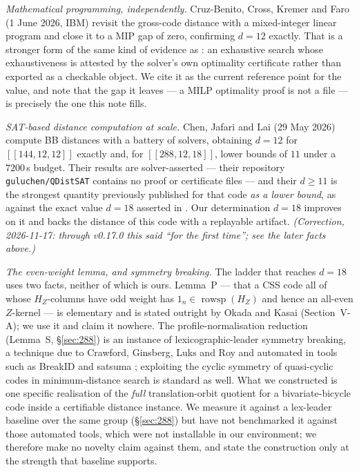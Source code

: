 \documentclass[11pt]{amsart}
\newcommand{\rowsp}{\operatorname{rowsp}}
\newcommand{\HZ}{H_{Z}}
\newcommand{\gross}{[[144,12,12]]}
\theoremstyle{plain}
\theoremstyle{definition}
\theoremstyle{remark}
\begin{document}
\emph{Mathematical programming, independently.} Cruz-Benito, Cross, Kremer and
Faro \cite{CruzBenito} (1 June 2026, IBM) revisit the gross-code distance with
a mixed-integer linear program and close it to a MIP gap of zero, confirming
$d=12$ exactly. That is a stronger form of the same kind of evidence as
\cite{BCGMRY}: an exhaustive search whose exhaustiveness is attested by the
solver's own optimality certificate rather than exported as a checkable
object. We cite it as the current reference point for the value, and note that
the gap it leaves --- a MILP optimality proof is not a file --- is precisely
the one this note fills.

\emph{SAT-based distance computation at scale.} Chen, Jafari and Lai
\cite{ChenJafariLai} (29 May 2026) compute BB distances with a battery of
solvers, obtaining $d=12$ for $\gross$ exactly and, for $[[288,12,18]]$, lower
bounds of $11$ under a $7200$\,s budget. Their results are solver-asserted ---
their repository \texttt{guluchen/QDistSAT} contains no proof or certificate
files --- and their $d\ge11$ is the strongest quantity previously published for
that code \emph{as a lower bound}, as against the exact value $d=18$ asserted
in \cite{BCGMRY}. Our determination $d=18$ improves on it and backs the
distance of this code with a replayable artifact. \emph{(Correction,
2026-11-17: through v0.17.0 this said ``for the first time''; see the later
facts above.)}

\emph{The even-weight lemma, and symmetry breaking.} The ladder that reaches
$d=18$ uses two facts, neither of which is ours. Lemma~P --- that a CSS code
all of whose $\HZ$-columns have odd weight has $1_n\in\rowsp(\HZ)$ and hence an
all-even $Z$-kernel --- is elementary and is stated outright by Okada and Kasai
\cite{OkadaKasai} (Section~V-A); we use it and claim it nowhere. The
profile-normalisation reduction (Lemma~S, \S\ref{sec:288}) is an instance of
lexicographic-leader symmetry breaking, a technique due to Crawford, Ginsberg,
Luks and Roy \cite{CGLR} and automated in tools such as BreakID \cite{BreakID}
and satsuma \cite{satsuma}; exploiting the cyclic symmetry of quasi-cyclic
codes in minimum-distance search is standard as well. What we constructed is
one specific realisation of the \emph{full} translation-orbit quotient for a
bivariate-bicycle code inside a certifiable distance instance. We measure it
against a lex-leader baseline over the same group (\S\ref{sec:288}) but have not
benchmarked it against those automated tools, which were not installable in our
environment; we therefore make no novelty claim against them, and state the
construction only at the strength that baseline supports.
\end{document}
